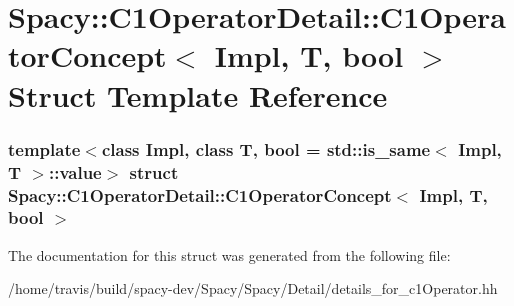 \hypertarget{structSpacy_1_1C1OperatorDetail_1_1C1OperatorConcept}{\section{\-Spacy\-:\-:\-C1\-Operator\-Detail\-:\-:\-C1\-Operator\-Concept$<$ \-Impl, \-T, bool $>$ \-Struct \-Template \-Reference}
\label{structSpacy_1_1C1OperatorDetail_1_1C1OperatorConcept}
}
\subsubsection*{template$<$class Impl, class T, bool = std\-::is\-\_\-same$<$ Impl, T $>$\-::value$>$ struct Spacy\-::\-C1\-Operator\-Detail\-::\-C1\-Operator\-Concept$<$ Impl, T, bool $>$}



\-The documentation for this struct was generated from the following file\-:\begin{DoxyCompactItemize}
\item 
/home/travis/build/spacy-\/dev/\-Spacy/\-Spacy/\-Detail/details\-\_\-for\-\_\-c1\-Operator.\-hh\end{DoxyCompactItemize}
